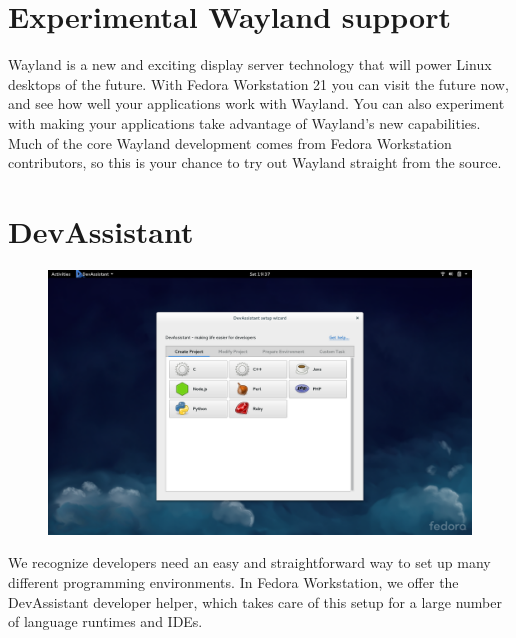 \documentclass[
10pt
]{leaflet}
\begin{document}
\section{\textcolor{FedoraBlue}{Experimental Wayland support}}
Wayland is a new and exciting display server technology that will power Linux desktops of the future. With Fedora Workstation 21 you can visit the future now, and see how well your applications work with Wayland. You can also experiment with making your applications take advantage of Wayland's new capabilities. Much of the core Wayland development comes from Fedora Workstation contributors, so this is your chance to try out Wayland straight from the source.



\section{\textcolor{FedoraBlue}{DevAssistant}}
\begin{figure}[h]
  \includegraphics[keepaspectratio,width=\textwidth]{Fedora_devassistant.png}
\end{figure}
We recognize developers need an easy and straightforward way to set up many different programming environments. In Fedora Workstation, we offer the DevAssistant developer helper, which takes care of this setup for a large number of language runtimes and IDEs.
\end{document}
